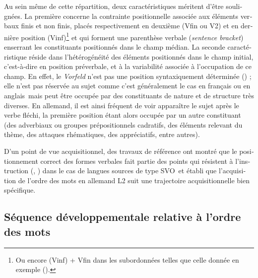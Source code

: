 \documentclass[output=paper]{langscibook}
\begin{document}
\begin{otherlanguage}{french}
Au sein même de cette répartition, deux caractéristiques méritent d’être soulignées. La première concerne la contrainte positionnelle associée aux éléments verbaux finis et non finis, placés respectivement en deuxième (Vfin ou V2) et en dernière position (Vinf)\footnote{Ou encore (Vinf) + Vfin dans les subordonnées telles que celle donnée en exemple ().} et qui forment une parenthèse verbale (\textit{sentence bracket}) enserrant les constituants positionnés dans le champ médian. La seconde caractéristique réside dans l’hétérogénéité des éléments positionnés dans le champ initial, c’est-à-dire en position préverbale, et à la variabilité associée à l’occupation de ce champ. En effet, le \textit{Vorfeld} n’est pas une position syntaxiquement déterminée (\citealt[1584]{ZifonunEtAl1997}) ; elle n’est pas réservée au sujet comme c’est généralement le cas en français ou en anglais~mais peut être occupée par des constituants de nature et de structure très diverses. En allemand, il est ainsi fréquent de voir apparaître le sujet après le verbe fléchi, la première position étant alors occupée par un autre constituant (des adverbiaux ou groupes prépositionnels cadratifs, des éléments relevant du thème, des attaques rhématiques, des appréciatifs, entre autres).

D’un point de vue acquisitionnel, des travaux de référence ont montré que le positionnement correct des formes verbales fait partie des points qui résistent à l’instruction (\citealt{Ellis1989}, \citealt{Pienemann1989}) dans le cas de langues sources de type SVO~et établi que l’acquisition de l’ordre des mots en allemand L2 suit une trajectoire acquisitionnelle bien spécifique.

\subsection{Séquence développementale relative à l’ordre des mots} \label{sec:felce:2.2}


\end{otherlanguage}
\end{document}
